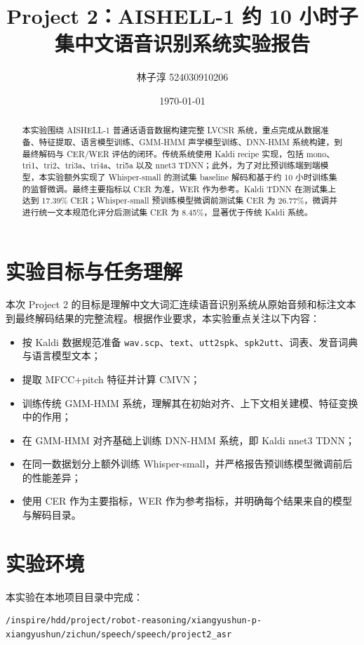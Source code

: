 \documentclass[UTF8,a4paper,12pt]{ctexart}
\title{Project 2：AISHELL-1 约 10 小时子集中文语音识别系统实验报告}
\author{林子淳 524030910206}
\date{\today}
\begin{document}
\maketitle

\begin{abstract}
本实验围绕 AISHELL-1 普通话语音数据构建完整 LVCSR 系统，重点完成从数据准备、特征提取、语言模型训练、GMM-HMM 声学模型训练、DNN-HMM 系统构建，到最终解码与 CER/WER 评估的闭环。传统系统使用 Kaldi recipe 实现，包括 mono、tri1、tri2、tri3a、tri4a、tri5a 以及 nnet3 TDNN；此外，为了对比预训练端到端模型，本实验额外实现了 Whisper-small 的测试集 baseline 解码和基于约 10 小时训练集的监督微调。最终主要指标以 CER 为准，WER 作为参考。Kaldi TDNN 在测试集上达到 17.39\% CER；Whisper-small 预训练模型微调前测试集 CER 为 26.77\%，微调并进行统一文本规范化评分后测试集 CER 为 8.45\%，显著优于传统 Kaldi 系统。
\end{abstract}

\section{实验目标与任务理解}

本次 Project 2 的目标是理解中文大词汇连续语音识别系统从原始音频和标注文本到最终解码结果的完整流程。根据作业要求，本实验重点关注以下内容：

\begin{itemize}
  \item 按 Kaldi 数据规范准备 \texttt{wav.scp}、\texttt{text}、\texttt{utt2spk}、\texttt{spk2utt}、词表、发音词典与语言模型文本；
  \item 提取 MFCC+pitch 特征并计算 CMVN；
  \item 训练传统 GMM-HMM 系统，理解其在初始对齐、上下文相关建模、特征变换中的作用；
  \item 在 GMM-HMM 对齐基础上训练 DNN-HMM 系统，即 Kaldi nnet3 TDNN；
  \item 在同一数据划分上额外训练 Whisper-small，并严格报告预训练模型微调前后的性能差异；
  \item 使用 CER 作为主要指标，WER 作为参考指标，并明确每个结果来自的模型与解码目录。
\end{itemize}

\section{实验环境}

本实验在本地项目目录中完成：

\begin{lstlisting}
/inspire/hdd/project/robot-reasoning/xiangyushun-p-xiangyushun/zichun/speech/speech/project2_asr
\end{lstlisting}
\end{document}
